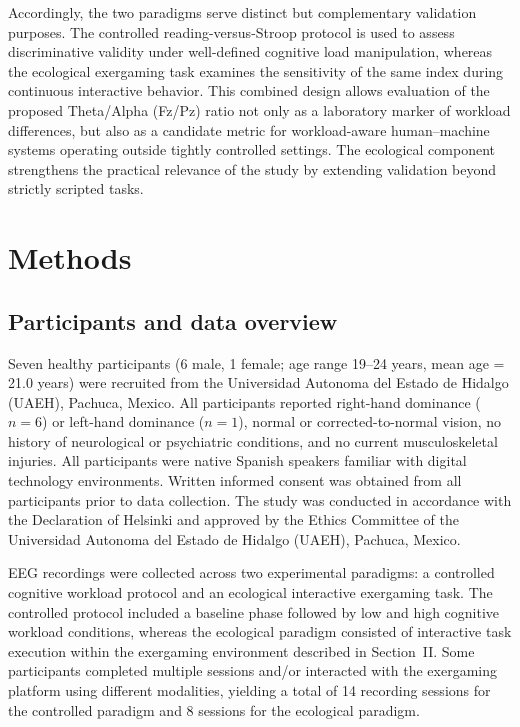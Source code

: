 \documentclass[10pt]{iopart}
\begin{document}
Accordingly, the two paradigms serve distinct but complementary validation purposes. The controlled reading-versus-Stroop protocol is used to assess discriminative validity under well-defined cognitive load manipulation, whereas the ecological exergaming task examines the sensitivity of the same index during continuous interactive behavior. This combined design allows evaluation of the proposed Theta/Alpha (Fz/Pz) ratio not only as a laboratory marker of workload differences, but also as a candidate metric for workload-aware human--machine systems operating outside tightly controlled settings. The ecological component strengthens the practical relevance of the study by extending validation beyond strictly scripted tasks.

\section{Methods}

\subsection{Participants and data overview}

Seven healthy participants (6 male, 1 female; age range 19--24
years, mean age = 21.0 years) were recruited from the Universidad
Autonoma del Estado de Hidalgo (UAEH), Pachuca, Mexico. All
participants reported right-hand dominance ($n = 6$) or
left-hand dominance ($n = 1$), normal or corrected-to-normal
vision, no history of neurological or psychiatric conditions,
and no current musculoskeletal injuries. All participants were
native Spanish speakers familiar with digital technology
environments. Written informed consent was obtained from all
participants prior to data collection. The study was conducted
in accordance with the Declaration of Helsinki and approved by
the Ethics Committee of the Universidad Autonoma del Estado de
Hidalgo (UAEH), Pachuca, Mexico.

EEG recordings were collected across two experimental paradigms:
a controlled cognitive workload protocol and an ecological
interactive exergaming task. The controlled protocol included a
baseline phase followed by low and high cognitive workload
conditions, whereas the ecological paradigm consisted of
interactive task execution within the exergaming environment
described in Section~II. Some participants completed multiple
sessions and/or interacted with the exergaming platform using
different modalities, yielding a total of 14 recording sessions
for the controlled paradigm and 8 sessions for the ecological
paradigm.
\end{document}

